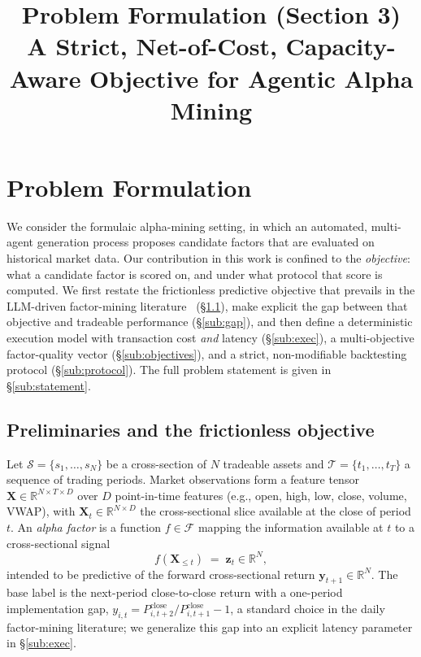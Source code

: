 \documentclass[11pt]{article}
\title{\vspace{-2.5em}\textbf{Problem Formulation (Section 3)}\\[0.3em]
\large A Strict, Net-of-Cost, Capacity-Aware Objective for Agentic Alpha Mining}
\date{}
\newcommand{\R}{\mathbb{R}}
\newcommand{\Fspace}{\mathcal{F}}
\newcommand{\sign}{\mathbf{z}}
\begin{document}
\maketitle
\vspace{-3em}

\section{Problem Formulation}
\label{sec:problem}

We consider the formulaic alpha-mining setting, in which an automated, multi-agent
generation process proposes candidate factors that are evaluated on historical market
data. Our contribution in this work is confined to the \emph{objective}: what a
candidate factor is scored on, and under what protocol that score is computed. We first
restate the frictionless predictive objective that prevails in the LLM-driven
factor-mining literature~\cite{han2026quantaalpha,shi2025alphajungle}
(\S\ref{sub:prelim}), make explicit the gap
between that objective and tradeable performance (\S\ref{sub:gap}), and then define a
deterministic execution model with transaction cost \emph{and} latency
(\S\ref{sub:exec}), a multi-objective factor-quality vector (\S\ref{sub:objectives}),
and a strict, non-modifiable backtesting protocol (\S\ref{sub:protocol}). The full
problem statement is given in \S\ref{sub:statement}.

\subsection{Preliminaries and the frictionless objective}
\label{sub:prelim}

Let $\mathcal{S}=\{s_1,\dots,s_N\}$ be a cross-section of $N$ tradeable assets and
$\mathcal{T}=\{t_1,\dots,t_T\}$ a sequence of trading periods. Market observations
form a feature tensor $\bm{X}\in\R^{N\times T\times D}$ over $D$ point-in-time
features (e.g., open, high, low, close, volume, VWAP), with $\bm{X}_t\in\R^{N\times D}$
the cross-sectional slice available at the close of period $t$. An \emph{alpha factor}
is a function $f\in\Fspace$ mapping the information available at $t$ to a
cross-sectional signal
\begin{equation}
  f(\bm{X}_{\le t}) \;=\; \sign_t \in \R^{N},
  \label{eq:factor}
\end{equation}
intended to be predictive of the forward cross-sectional return
$\bm{y}_{t+1}\in\R^{N}$. The base label is the next-period close-to-close return with a
one-period implementation gap,
$y_{i,t}=P^{\mathrm{close}}_{i,t+2}/P^{\mathrm{close}}_{i,t+1}-1$, a standard choice in
the daily factor-mining literature; we generalize this gap into an explicit latency
parameter in \S\ref{sub:exec}.
\end{document}
